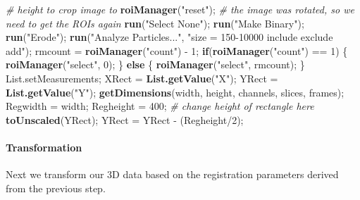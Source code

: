 \documentclass[11pt,singlespacinge,twoside]{reedthesis} %
\newenvironment{Shaded}{}{}
\newcommand{\CommentTok}[1]{\textit{#1}}
\newcommand{\ControlFlowTok}[1]{\textbf{#1}}
\newcommand{\DecValTok}[1]{#1}
\newcommand{\KeywordTok}[1]{\textbf{#1}}
\newcommand{\NormalTok}[1]{#1}
\newcommand{\OperatorTok}[1]{#1}
\newcommand{\StringTok}[1]{#1}
\theoremstyle{definition}
\theoremstyle{definition}
\theoremstyle{definition}
\theoremstyle{remark}
\begin{document}
\begin{Shaded}
\begin{Highlighting}[numbers=left,,]
\CommentTok{# height to crop image to}
    \KeywordTok{roiManager}\NormalTok{(}\StringTok{"reset"}\NormalTok{); }\CommentTok{# the image was rotated, so we need to get the ROIs again}
    \KeywordTok{run}\NormalTok{(}\StringTok{"Select None"}\NormalTok{);}
    \KeywordTok{run}\NormalTok{(}\StringTok{"Make Binary"}\NormalTok{);}
    \KeywordTok{run}\NormalTok{(}\StringTok{"Erode"}\NormalTok{);}
    \KeywordTok{run}\NormalTok{(}\StringTok{"Analyze Particles..."}\NormalTok{, }\StringTok{"size = 150-10000 include exclude add"}\NormalTok{);}
\NormalTok{    rmcount =}\StringTok{ }\KeywordTok{roiManager}\NormalTok{(}\StringTok{"count"}\NormalTok{) }\OperatorTok{-}\StringTok{ }\DecValTok{1}\NormalTok{;}
    \ControlFlowTok{if}\NormalTok{(}\KeywordTok{roiManager}\NormalTok{(}\StringTok{"count"}\NormalTok{) }\OperatorTok{==}\StringTok{ }\DecValTok{1}\NormalTok{) \{}
        \KeywordTok{roiManager}\NormalTok{(}\StringTok{"select"}\NormalTok{, }\DecValTok{0}\NormalTok{);}
\NormalTok{    \} }\ControlFlowTok{else}\NormalTok{ \{}
        \KeywordTok{roiManager}\NormalTok{(}\StringTok{"select"}\NormalTok{, rmcount);}
\NormalTok{    \}}
\NormalTok{    List.setMeasurements;}
\NormalTok{    XRect =}\StringTok{ }\KeywordTok{List.getValue}\NormalTok{(}\StringTok{"X"}\NormalTok{);}
\NormalTok{    YRect =}\StringTok{ }\KeywordTok{List.getValue}\NormalTok{(}\StringTok{"Y"}\NormalTok{);}
    \KeywordTok{getDimensions}\NormalTok{(width, height, channels, slices, frames);}
\NormalTok{    Regwidth =}\StringTok{ }\NormalTok{width;}
\NormalTok{    Regheight =}\StringTok{ }\DecValTok{400}\NormalTok{; }\CommentTok{# change height of rectangle here}
    \KeywordTok{toUnscaled}\NormalTok{(YRect);}
\NormalTok{    YRect =}\StringTok{ }\NormalTok{YRect }\OperatorTok{-}\StringTok{ }\NormalTok{(Regheight}\OperatorTok{/}\DecValTok{2}\NormalTok{);}
\end{Highlighting}
\end{Shaded}
\normalsize

\hypertarget{transformation}{%
\paragraph{Transformation}\label{transformation}}

Next we transform our 3D data based on the registration parameters derived from the previous step.
\end{document}
